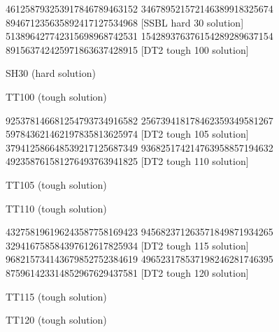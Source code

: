 \documentclass[twoside]{article}
\begin{document}
\renewcommand*{\puzzlefile}{sh30.ans}
\writepuzzle%
{461258793}{253917846}{789463152}%
{346789521}{572146389}{918325674}%
{894671235}{635892417}{127534968}%
[SSBL hard 30 solution]
\renewcommand*{\puzzlefile}{tt100.ans}
\writepuzzle%
{513896427}{742315698}{968742531}%
{154289376}{376154289}{289637154}%
{891563742}{425971863}{637428915}%
[DT2 tough 100 solution]
\vfill
\noindent\begin{minipage}{0.47\linewidth}\begin{center}
SH30 (hard solution) \\
\end{center}\end{minipage}
\hfill
\begin{minipage}{0.47\linewidth}\begin{center}
TT100 (tough solution) \\
\end{center}\end{minipage}

\renewcommand*{\puzzlefile}{tt105.ans}
\writepuzzle%
{925378146}{681254793}{734916582}%
{256739418}{178462359}{349581267}%
{597843621}{462197835}{813625974}%
[DT2 tough 105 solution]
\renewcommand*{\puzzlefile}{tt110.ans}
\writepuzzle%
{379412586}{648539217}{125687349}%
{936825174}{214763958}{857194632}%
{492358761}{581276493}{763941825}%
[DT2 tough 110 solution]
\vfill
\noindent\begin{minipage}{0.47\linewidth}\begin{center}
TT105 (tough solution) \\
\end{center}\end{minipage}
\hfill
\begin{minipage}{0.47\linewidth}\begin{center}
TT110 (tough solution) \\
\end{center}\end{minipage}

\renewcommand*{\puzzlefile}{tt115.ans}
\writepuzzle%
{432758196}{196243587}{758169423}%
{945682371}{263571849}{871934265}%
{329416758}{584397612}{617825934}%
[DT2 tough 115 solution]
\renewcommand*{\puzzlefile}{tt120.ans}
\writepuzzle%
{968215734}{143679852}{752384619}%
{496523178}{537198246}{281746395}%
{875961423}{314852967}{629437581}%
[DT2 tough 120 solution]
\vfill
\noindent\begin{minipage}{0.47\linewidth}\begin{center}
TT115 (tough solution) \\
\end{center}\end{minipage}
\hfill
\begin{minipage}{0.47\linewidth}\begin{center}
TT120 (tough solution) \\
\end{center}\end{minipage}
\end{document}
